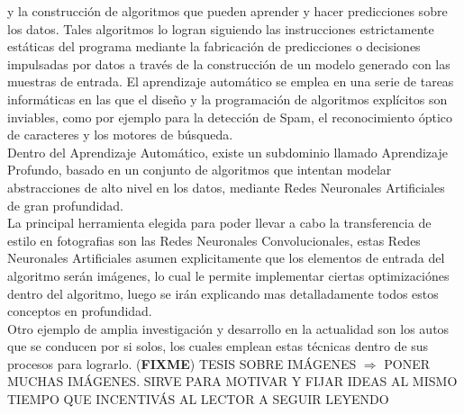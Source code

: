 \documentclass[a4paper,11pt,spanish]{book}
\newcommand*{\FIXME}[1]{{(\textbf{FIXME}) {#1}}}
\begin{document}
    y la construcción de algoritmos que pueden aprender y hacer predicciones sobre los datos. Tales algoritmos lo logran siguiendo las instrucciones estrictamente estáticas del programa 
    mediante la fabricación de predicciones o decisiones impulsadas por datos​ a través de la construcción de un modelo generado con las muestras de entrada. El aprendizaje automático 
    se emplea en una serie de tareas informáticas en las que el diseño y la programación de algoritmos explícitos son inviables, como por ejemplo para la detección de Spam, el reconocimiento
    óptico de caracteres y los motores de búsqueda.\\
    Dentro del Aprendizaje Automático, existe un subdominio llamado Aprendizaje Profundo, basado en un conjunto de algoritmos que intentan modelar abstracciones de alto nivel en los datos,
    mediante Redes Neuronales Artificiales de gran profundidad.\\
    La principal herramienta elegida para poder llevar a cabo la transferencia de estilo en fotografias son las Redes Neuronales Convolucionales, estas Redes Neuronales Artificiales asumen 
    explicitamente que los elementos de  entrada del algoritmo serán imágenes, lo cual le permite implementar ciertas optimizaciónes dentro del algoritmo, luego
    se irán explicando mas detalladamente todos estos conceptos en profundidad.\\
    Otro ejemplo de amplia investigación y desarrollo en la actualidad son los autos que se conducen por si solos, los cuales emplean estas técnicas dentro de sus procesos para lograrlo.
  \FIXME{TESIS SOBRE IMÁGENES $\Rightarrow$ PONER MUCHAS IMÁGENES. SIRVE PARA MOTIVAR Y FIJAR IDEAS AL MISMO TIEMPO QUE INCENTIVÁS AL LECTOR A SEGUIR LEYENDO}
  
\end{document}
